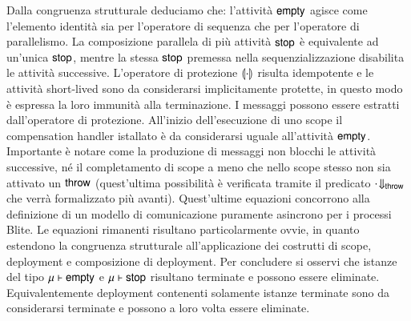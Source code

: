 
Dalla congruenza strutturale deduciamo che: l'attività ${\sf empty}$ agisce come
l'elemento identità sia per l'operatore di sequenza che per l'operatore di
parallelismo. La composizione parallela di più attività ${\sf stop}$ è equivalente ad
un'unica ${\sf stop}$, mentre la stessa ${\sf stop}$ premessa nella sequenzializzazione
disabilita le attività successive. L'operatore di protezione $\llparenthesis \cdot\rrparenthesis$
risulta idempotente e le attività short-lived sono da considerarsi implicitamente
protette, in questo modo è espressa la loro immunità alla terminazione. I
messaggi possono essere estratti dall'operatore di protezione.
All'inizio dell'esecuzione di uno scope il compensation handler istallato è da
considerarsi uguale all'attività ${\sf empty}$. Importante è notare come la
produzione di messaggi non blocchi le attività successive, né il completamento
di scope a meno che nello scope stesso non sia attivato un ${\sf throw}$
(quest'ultima possibilità è verificata tramite il predicato ${\sf \cdot}\!\Downarrow_{{\sf throw}}$ che
verrà formalizzato più avanti). Quest'ultime equazioni concorrono alla
definizione di un modello di comunicazione puramente asincrono per i processi
Blite. Le equazioni rimanenti risultano particolarmente ovvie, in quanto
estendono la congruenza strutturale all'applicazione dei costrutti di scope,
deployment e composizione di deployment. Per concludere si osservi che istanze
del tipo ${\sf \mu} \vdash {\sf empty}$ e ${\sf \mu} \vdash {\sf stop}$ risultano
terminate e possono essere eliminate. Equivalentemente deployment contenenti
solamente istanze terminate sono da considerarsi terminate e possono a loro
volta essere eliminate.
\\

